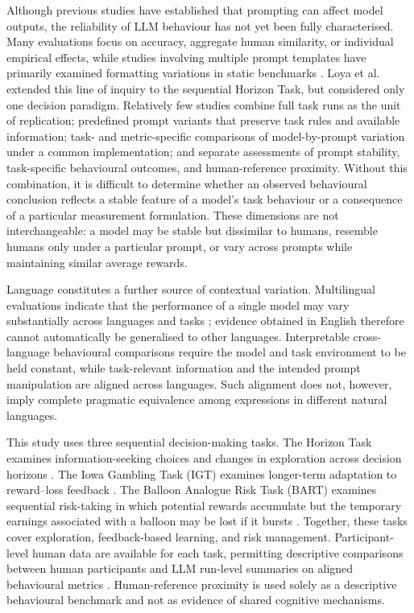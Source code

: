 \documentclass[logo,msc]{infthesis}
\begin{document}
Although previous studies have established that prompting can affect model outputs, the reliability of LLM behaviour has not yet been fully characterised. Many evaluations focus on accuracy, aggregate human similarity, or individual empirical effects, while studies involving multiple prompt templates have primarily examined formatting variations in static benchmarks \cite{Sclar2024PromptFormatting}. Loya et al.~\cite{Loya2023PromptSensitivityDecision} extended this line of inquiry to the sequential Horizon Task, but considered only one decision paradigm. Relatively few studies combine full task runs as the unit of replication; predefined prompt variants that preserve task rules and available information; task- and metric-specific comparisons of model-by-prompt variation under a common implementation; and separate assessments of prompt stability, task-specific behavioural outcomes, and human-reference proximity. Without this combination, it is difficult to determine whether an observed behavioural conclusion reflects a stable feature of a model's task behaviour or a consequence of a particular measurement formulation. These dimensions are not interchangeable: a model may be stable but dissimilar to humans, resemble humans only under a particular prompt, or vary across prompts while maintaining similar average rewards.

Language constitutes a further source of contextual variation. Multilingual evaluations indicate that the performance of a single model may vary substantially across languages and tasks \cite{Ahuja2023MEGA}; evidence obtained in English therefore cannot automatically be generalised to other languages. Interpretable cross-language behavioural comparisons require the model and task environment to be held constant, while task-relevant information and the intended prompt manipulation are aligned across languages. Such alignment does not, however, imply complete pragmatic equivalence among expressions in different natural languages.

This study uses three sequential decision-making tasks. The Horizon Task examines information-seeking choices and changes in exploration across decision horizons \cite{Wilson2014}. The Iowa Gambling Task (IGT) examines longer-term adaptation to reward--loss feedback \cite{Bechara1994}. The Balloon Analogue Risk Task (BART) examines sequential risk-taking in which potential rewards accumulate but the temporary earnings associated with a balloon may be lost if it bursts \cite{Lejuez2002}. Together, these tasks cover exploration, feedback-based learning, and risk management. Participant-level human data are available for each task, permitting descriptive comparisons between human participants and LLM run-level summaries on aligned behavioural metrics \cite{Feng2021ExploreExploit,Steingroever2015IGTData,Sebri2023BART}. Human-reference proximity is used solely as a descriptive behavioural benchmark and not as evidence of shared cognitive mechanisms.
\end{document}
